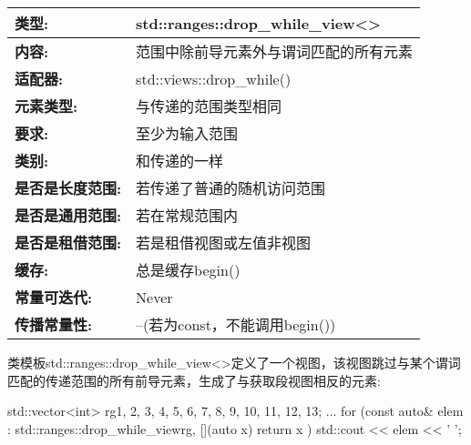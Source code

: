 
\begin{longtable}[c]{|l|l|}
\hline
\textbf{类型:}                 & std::ranges::drop\_while\_view\textless{}\textgreater{}        \\ \hline
\endfirsthead
%
\endhead
%
\textbf{内容:}              & 范围中除前导元素外与谓词匹配的所有元素 \\ \hline
\textbf{适配器:}              & std::views::drop\_while()                                      \\ \hline
\textbf{元素类型:}         & 与传递的范围类型相同                                      \\ \hline
\textbf{要求:}             & 至少为输入范围                                           \\ \hline
\textbf{类别:}             & 和传递的一样                                                 \\ \hline
\textbf{是否是长度范围:}       & 若传递了普通的随机访问范围                           \\ \hline
\textbf{是否是通用范围:}      & 若在常规范围内                                             \\ \hline
\textbf{是否是租借范围:}    & 若是租借视图或左值非视图                      \\ \hline
\textbf{缓存:}               & 总是缓存begin()                                          \\ \hline
\textbf{常量可迭代:}       & Never                                                          \\ \hline
\textbf{传播常量性:} & --(若为const，不能调用begin())                               \\ \hline
\end{longtable}

类模板std::ranges::drop\_while\_view<>定义了一个视图，该视图跳过与某个谓词匹配的传递范围的所有前导元素，生成了与获取段视图相反的元素:

\begin{cpp}
std::vector<int> rg{1, 2, 3, 4, 5, 6, 7, 8, 9, 10, 11, 12, 13};
...
for (const auto& elem : std::ranges::drop_while_view{rg, [](auto x) {
						return x %
				}}) {
	std::cout << elem << ' ';
}
\end{cpp}

